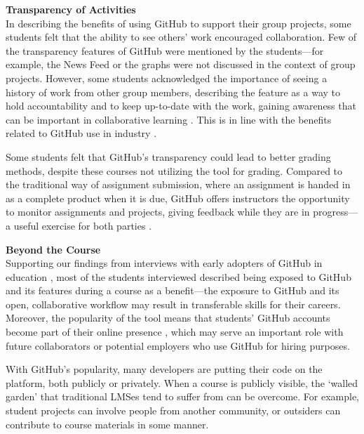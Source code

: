 \textbf{Transparency of Activities} \\
In describing the benefits of using GitHub to support their group projects, some students felt that the ability to see others' work encouraged collaboration. Few of the transparency features of GitHub were mentioned by the students---for example, the News Feed or the graphs were not discussed in the context of group projects. However, some students acknowledged the importance of seeing a history of work from other group members, describing the feature as a way to hold accountability and to keep up-to-date with the work, gaining awareness that can be important in collaborative learning \cite{janssen2013coordinated}. This is in line with the benefits related to GitHub use in industry \cite{dabbish2012social}.

Some students felt that GitHub's transparency could lead to better grading methods, despite these courses not utilizing the tool for grading. Compared to the traditional way of assignment submission, where an assignment is handed in as a complete product when it is due, GitHub offers instructors the opportunity to monitor assignments and projects, giving feedback while they are in progress---a useful exercise for both parties \cite{glassy2006using}.

\textbf{Beyond the Course} \\
Supporting our findings from interviews with early adopters of GitHub in education \cite{zagalsky2015emergence}, most of the students interviewed described being exposed to GitHub and its features during a course as a benefit---the exposure to GitHub and its open, collaborative workflow may result in transferable skills for their careers. Moreover, the popularity of the tool means that students' GitHub accounts become part of their online presence \cite{marlow2013impression}, which may serve an important role with future collaborators or potential employers who use GitHub for hiring purposes.

With GitHub's popularity, many developers are putting their code on the platform, both publicly or privately. When a course is publicly visible, the `walled garden' that traditional LMSes tend to suffer from \cite{mott2010envisioning} can be overcome. For example, student projects can involve people from another community, or outsiders can contribute to course materials in some manner. \\

